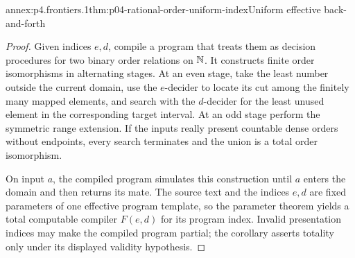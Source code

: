 
\begin{annexitem}{annex:p4.frontiers.1}{thm:p04-rational-order-uniform-index}{Uniform effective back-and-forth}
\begin{proof}
Given indices \(e,d\), compile a program that treats them as decision
procedures for two binary order relations on \(\mathbb{N}\).  It constructs finite
order isomorphisms in alternating stages.  At an even stage, take the least
number outside the current domain, use the \(e\)-decider to locate its cut
among the finitely many mapped elements, and search with the \(d\)-decider for
the least unused element in the corresponding target interval.  At an odd
stage perform the symmetric range extension.  If the inputs really present
countable dense orders without endpoints, every search terminates and the
union is a total order isomorphism.

On input \(a\), the compiled program simulates this construction until \(a\)
enters the domain and then returns its mate.  The source text and the indices
\(e,d\) are fixed parameters of one effective program template, so the
parameter theorem yields a total computable compiler \(F(e,d)\) for its
program index.  Invalid presentation indices may make the compiled program
partial; the corollary asserts totality only under its displayed validity
hypothesis.
\end{proof}
\end{annexitem}

